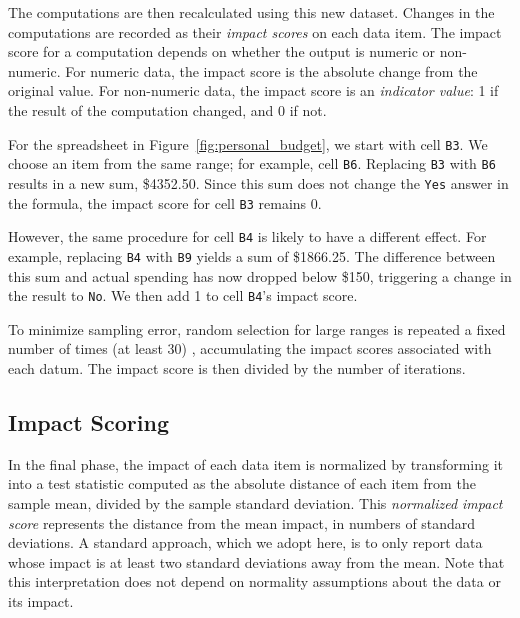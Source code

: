 The computations are then recalculated using this new dataset. Changes
in the computations are recorded as their \emph{impact scores} on each
data item.  The impact score for a computation depends on whether the
output is numeric or non-numeric. For numeric data, the impact score
is the absolute change from the original value.
For non-numeric data, the impact score is an \emph{indicator value}: 1
if the result of the computation changed, and 0 if not.

For the spreadsheet in Figure~\ref{fig:personal_budget}, we %
start with cell \texttt{B3}. We choose an item from the same
range; for example, cell \texttt{B6}. Replacing \texttt{B3}
with \texttt{B6} results in a new sum, \$4352.50. Since this sum does
not change the \texttt{Yes} answer in the formula, the impact score
for cell \texttt{B3} remains 0.

However, the same procedure for cell \texttt{B4} is likely to have a
different effect.  For example, replacing \texttt{B4}
with \texttt{B9} yields a sum of \$1866.25. The difference
between this sum and actual spending has now dropped below \$150,
triggering a change in the result to \texttt{No}. We then
add 1 to cell \texttt{B4}'s impact score.


To minimize sampling error, random
selection for large ranges is repeated a fixed number of times (at least 30) ,
accumulating the impact scores associated with each datum. The impact
score is then divided by the number of
iterations. 

\subsection{Impact Scoring}

In the final phase, the impact of each data item is normalized by transforming
it into a test statistic computed as the absolute distance of each item from
the sample mean, divided by the sample standard deviation. This
\emph{normalized impact score} represents the distance from the mean impact,
in numbers of standard deviations. A standard approach, which we adopt here,
is to only report data whose impact is at least two standard deviations away
from the mean. Note that this interpretation does not depend on normality
assumptions about the data or its impact.

